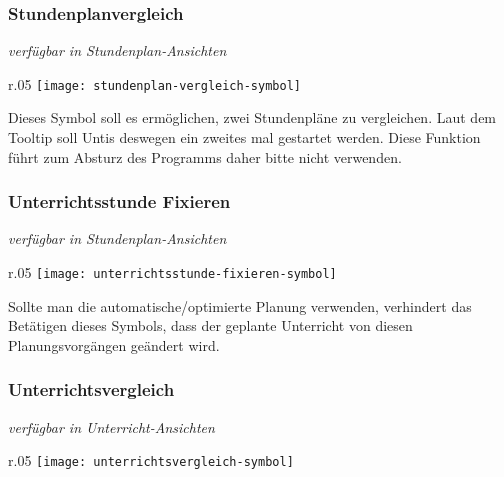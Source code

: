 \subsubsection{Stundenplanvergleich}
{\small\textit{verfügbar in Stundenplan-Ansichten\\}\par}

\begin{wrapfigure}{r}{.05\textwidth}
	\vspace{-50pt}
	\texttt{[image: stundenplan-vergleich-symbol]}
	\vspace{-35pt}
\end{wrapfigure}

\noindent
Dieses Symbol soll es ermöglichen, zwei Stundenpläne zu vergleichen. Laut dem Tooltip soll Untis deswegen ein zweites mal gestartet werden. Diese Funktion führt zum Absturz des Programms daher bitte nicht verwenden.\\

\subsubsection{Unterrichtsstunde Fixieren}
{\small\textit{verfügbar in Stundenplan-Ansichten\\}\par}

\begin{wrapfigure}{r}{.05\textwidth}
	\vspace{-50pt}
	\texttt{[image: unterrichtsstunde-fixieren-symbol]}
	\vspace{-35pt}
\end{wrapfigure}

\noindent
Sollte man die automatische/optimierte Planung verwenden, verhindert das Betätigen dieses Symbols, dass der geplante Unterricht von diesen Planungsvorgängen geändert wird.\\

\subsubsection{Unterrichtsvergleich}
{\small\textit{verfügbar in Unterricht-Ansichten\\}\par}

\begin{wrapfigure}{r}{.05\textwidth}
	\vspace{-50pt}
	\texttt{[image: unterrichtsvergleich-symbol]}
	\vspace{-35pt}
\end{wrapfigure}

